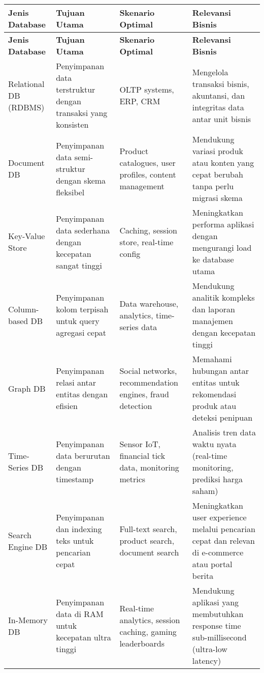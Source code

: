 \begin{longtable}{|p{}|p{}|p{}|p{}|}
	\hline
	\textbf{Jenis Database} & \textbf{Tujuan Utama} & \textbf{Skenario Optimal} & \textbf{Relevansi Bisnis} \\
	\hline
	\endfirsthead
	\hline
	\textbf{Jenis Database} & \textbf{Tujuan Utama} & \textbf{Skenario Optimal} & \textbf{Relevansi Bisnis} \\
	\hline
	\endhead
	
	Relational DB (RDBMS) & Penyimpanan data terstruktur dengan transaksi yang konsisten & OLTP systems, ERP, CRM & Mengelola transaksi bisnis, akuntansi, dan integritas data antar unit bisnis \\
	\hline
	
	Document DB & Penyimpanan data semi-struktur dengan skema fleksibel & Product catalogues, user profiles, content management & Mendukung variasi produk atau konten yang cepat berubah tanpa perlu migrasi skema \\
	\hline
	
	Key-Value Store & Penyimpanan data sederhana dengan kecepatan sangat tinggi & Caching, session store, real-time config & Meningkatkan performa aplikasi dengan mengurangi load ke database utama \\
	\hline
	
	Column-based DB & Penyimpanan kolom terpisah untuk query agregasi cepat & Data warehouse, analytics, time-series data & Mendukung analitik kompleks dan laporan manajemen dengan kecepatan tinggi \\
	\hline
	
	Graph DB & Penyimpanan relasi antar entitas dengan efisien & Social networks, recommendation engines, fraud detection & Memahami hubungan antar entitas untuk rekomendasi produk atau deteksi penipuan \\
	\hline
	
	Time-Series DB & Penyimpanan data berurutan dengan timestamp & Sensor IoT, financial tick data, monitoring metrics & Analisis tren data waktu nyata (real-time monitoring, prediksi harga saham) \\
	\hline
	
	Search Engine DB & Penyimpanan dan indexing teks untuk pencarian cepat & Full-text search, product search, document search & Meningkatkan user experience melalui pencarian cepat dan relevan di e-commerce atau portal berita \\
	\hline
	
	In-Memory DB & Penyimpanan data di RAM untuk kecepatan ultra tinggi & Real-time analytics, session caching, gaming leaderboards & Mendukung aplikasi yang membutuhkan response time sub-millisecond (ultra-low latency) \\
	\hline
	

\end{longtable}
